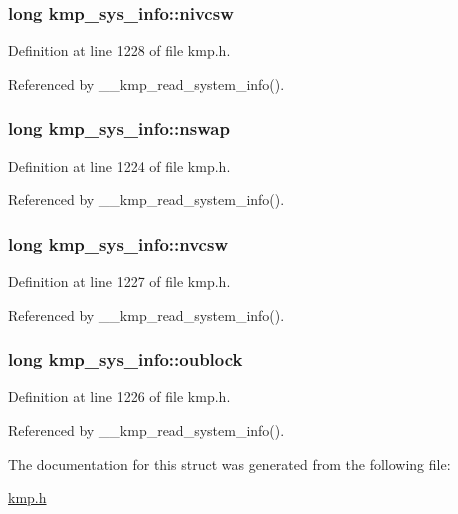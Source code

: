 \hypertarget{structkmp__sys__info_ac7e30691b19415226d39bd4ed92af7a6}{
\subsubsection[{nivcsw}]{\setlength{\rightskip}{0pt plus 5cm}long kmp\-\_\-sys\-\_\-info\-::nivcsw}}\label{structkmp__sys__info_ac7e30691b19415226d39bd4ed92af7a6}


Definition at line 1228 of file kmp.\-h.



Referenced by \-\_\-\-\_\-kmp\-\_\-read\-\_\-system\-\_\-info().

\hypertarget{structkmp__sys__info_aba9c0c66063cc7bdba0b84d87f90b25b}{
\subsubsection[{nswap}]{\setlength{\rightskip}{0pt plus 5cm}long kmp\-\_\-sys\-\_\-info\-::nswap}}\label{structkmp__sys__info_aba9c0c66063cc7bdba0b84d87f90b25b}


Definition at line 1224 of file kmp.\-h.



Referenced by \-\_\-\-\_\-kmp\-\_\-read\-\_\-system\-\_\-info().

\hypertarget{structkmp__sys__info_a82b3d7c37a16144f173a69624ef27057}{
\subsubsection[{nvcsw}]{\setlength{\rightskip}{0pt plus 5cm}long kmp\-\_\-sys\-\_\-info\-::nvcsw}}\label{structkmp__sys__info_a82b3d7c37a16144f173a69624ef27057}


Definition at line 1227 of file kmp.\-h.



Referenced by \-\_\-\-\_\-kmp\-\_\-read\-\_\-system\-\_\-info().

\hypertarget{structkmp__sys__info_ab55bb38f87dbda622851940106f8a1c0}{
\subsubsection[{oublock}]{\setlength{\rightskip}{0pt plus 5cm}long kmp\-\_\-sys\-\_\-info\-::oublock}}\label{structkmp__sys__info_ab55bb38f87dbda622851940106f8a1c0}


Definition at line 1226 of file kmp.\-h.



Referenced by \-\_\-\-\_\-kmp\-\_\-read\-\_\-system\-\_\-info().



The documentation for this struct was generated from the following file\-:\begin{DoxyCompactItemize}
\item 
\hyperlink{kmp_8h}{kmp.\-h}\end{DoxyCompactItemize}
